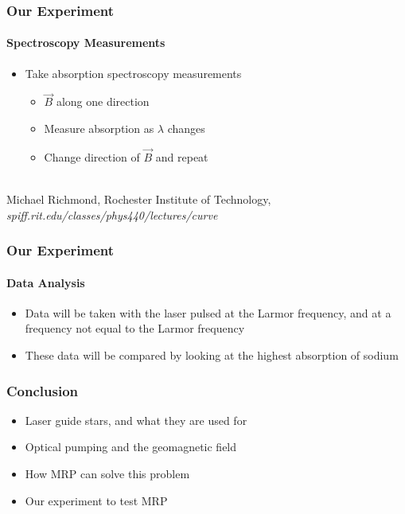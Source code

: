 \documentclass{beamer}
\begin{document}
\begin{frame}
  \frametitle{Our Experiment}
  \framesubtitle{Spectroscopy Measurements}
  \begin{itemize}
	\item Take absorption spectroscopy measurements
	  \begin{itemize}
		\item $\vec B$ along one direction
		\item Measure absorption as $\lambda$ changes
		\item Change direction of $\vec B$ and repeat
	  \end{itemize}
  \end{itemize}
  \begin{center}
  \end{center}
  \\{\tiny Michael Richmond, Rochester Institute of Technology, \textit{spiff.rit.edu/classes/phys440/lectures/curve}}
\end{frame}

\begin{frame}
  \frametitle{Our Experiment}
  \framesubtitle{Data Analysis}
  \begin{itemize}
	\item Data will be taken with the laser pulsed at the Larmor frequency, and at a frequency not equal to the Larmor frequency
	\item These data will be compared by looking at the highest absorption of sodium
  \end{itemize}
\end{frame}


\begin{frame}
  \frametitle{Conclusion}
  \begin{itemize}
	\item Laser guide stars, and what they are used for
	\item Optical pumping and the geomagnetic field
	\item How MRP can solve this problem
	\item Our experiment to test MRP
  \end{itemize}
\end{frame}
\end{document}
